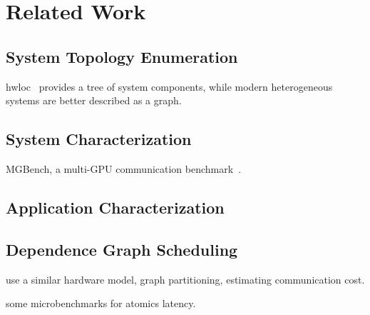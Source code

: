 \chapter{Related Work}
\label{ch:related}

\section{System Topology Enumeration}

hwloc~\cite{broquedis2010hwloc} provides a tree of system components, while modern heterogeneous systems are better described as a graph.


\section{System Characterization}

MGBench, a multi-GPU communication benchmark~\cite{bennun2016mgbench}.

\section{Application Characterization}


\section{Dependence Graph Scheduling}

\cite{amaral2017topology} use a similar hardware model, graph partitioning, estimating communication cost.

\cite{gomez2013performance} some microbenchmarks for atomics latency.